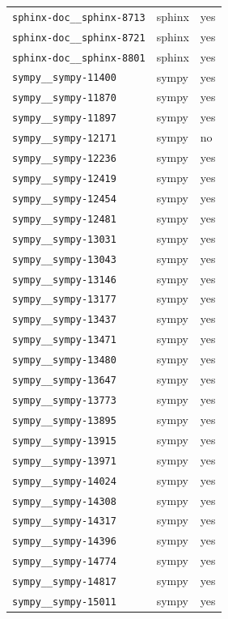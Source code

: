 \begin{longtable}{@{}p{}lp{}@{}}
\texttt{sphinx-doc\_\_sphinx-8713} & sphinx & yes \\
\texttt{sphinx-doc\_\_sphinx-8721} & sphinx & yes \\
\texttt{sphinx-doc\_\_sphinx-8801} & sphinx & yes \\
\texttt{sympy\_\_sympy-11400} & sympy & yes \\
\texttt{sympy\_\_sympy-11870} & sympy & yes \\
\texttt{sympy\_\_sympy-11897} & sympy & yes \\
\texttt{sympy\_\_sympy-12171} & sympy & no \\
\texttt{sympy\_\_sympy-12236} & sympy & yes \\
\texttt{sympy\_\_sympy-12419} & sympy & yes \\
\texttt{sympy\_\_sympy-12454} & sympy & yes \\
\texttt{sympy\_\_sympy-12481} & sympy & yes \\
\texttt{sympy\_\_sympy-13031} & sympy & yes \\
\texttt{sympy\_\_sympy-13043} & sympy & yes \\
\texttt{sympy\_\_sympy-13146} & sympy & yes \\
\texttt{sympy\_\_sympy-13177} & sympy & yes \\
\texttt{sympy\_\_sympy-13437} & sympy & yes \\
\texttt{sympy\_\_sympy-13471} & sympy & yes \\
\texttt{sympy\_\_sympy-13480} & sympy & yes \\
\texttt{sympy\_\_sympy-13647} & sympy & yes \\
\texttt{sympy\_\_sympy-13773} & sympy & yes \\
\texttt{sympy\_\_sympy-13895} & sympy & yes \\
\texttt{sympy\_\_sympy-13915} & sympy & yes \\
\texttt{sympy\_\_sympy-13971} & sympy & yes \\
\texttt{sympy\_\_sympy-14024} & sympy & yes \\
\texttt{sympy\_\_sympy-14308} & sympy & yes \\
\texttt{sympy\_\_sympy-14317} & sympy & yes \\
\texttt{sympy\_\_sympy-14396} & sympy & yes \\
\texttt{sympy\_\_sympy-14774} & sympy & yes \\
\texttt{sympy\_\_sympy-14817} & sympy & yes \\
\texttt{sympy\_\_sympy-15011} & sympy & yes \\

\end{longtable}
